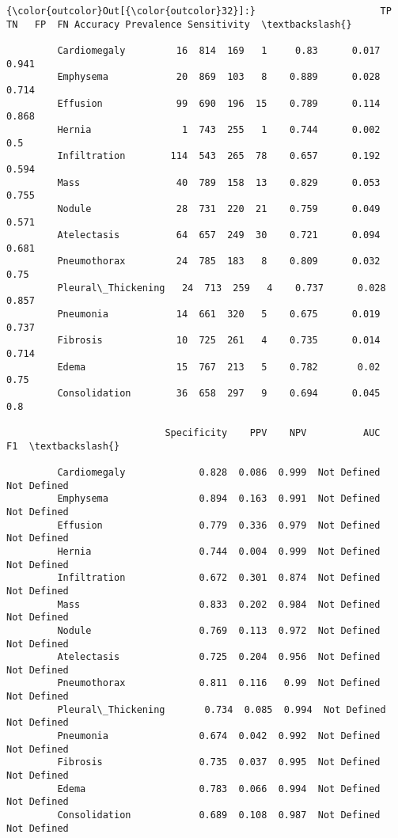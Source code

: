 \documentclass[11pt]{article}
\begin{document}
\begin{Verbatim}[commandchars=\\\{\}]
{\color{outcolor}Out[{\color{outcolor}32}]:}                      TP   TN   FP  FN Accuracy Prevalence Sensitivity  \textbackslash{}
                                                                                 
         Cardiomegaly         16  814  169   1     0.83      0.017       0.941   
         Emphysema            20  869  103   8    0.889      0.028       0.714   
         Effusion             99  690  196  15    0.789      0.114       0.868   
         Hernia                1  743  255   1    0.744      0.002         0.5   
         Infiltration        114  543  265  78    0.657      0.192       0.594   
         Mass                 40  789  158  13    0.829      0.053       0.755   
         Nodule               28  731  220  21    0.759      0.049       0.571   
         Atelectasis          64  657  249  30    0.721      0.094       0.681   
         Pneumothorax         24  785  183   8    0.809      0.032        0.75   
         Pleural\_Thickening   24  713  259   4    0.737      0.028       0.857   
         Pneumonia            14  661  320   5    0.675      0.019       0.737   
         Fibrosis             10  725  261   4    0.735      0.014       0.714   
         Edema                15  767  213   5    0.782       0.02        0.75   
         Consolidation        36  658  297   9    0.694      0.045         0.8   
         
                            Specificity    PPV    NPV          AUC           F1  \textbackslash{}
                                                                                  
         Cardiomegaly             0.828  0.086  0.999  Not Defined  Not Defined   
         Emphysema                0.894  0.163  0.991  Not Defined  Not Defined   
         Effusion                 0.779  0.336  0.979  Not Defined  Not Defined   
         Hernia                   0.744  0.004  0.999  Not Defined  Not Defined   
         Infiltration             0.672  0.301  0.874  Not Defined  Not Defined   
         Mass                     0.833  0.202  0.984  Not Defined  Not Defined   
         Nodule                   0.769  0.113  0.972  Not Defined  Not Defined   
         Atelectasis              0.725  0.204  0.956  Not Defined  Not Defined   
         Pneumothorax             0.811  0.116   0.99  Not Defined  Not Defined   
         Pleural\_Thickening       0.734  0.085  0.994  Not Defined  Not Defined   
         Pneumonia                0.674  0.042  0.992  Not Defined  Not Defined   
         Fibrosis                 0.735  0.037  0.995  Not Defined  Not Defined   
         Edema                    0.783  0.066  0.994  Not Defined  Not Defined   
         Consolidation            0.689  0.108  0.987  Not Defined  Not Defined   
         

\end{Verbatim}
\end{document}
